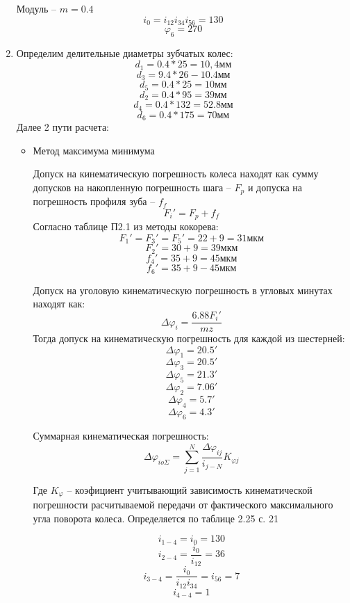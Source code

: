 \documentclass{article}
\begin{document}
\begin{enumerate}
	Модуль -- $m = 0.4$
	$$
	i_0 = i_{12} i_{34} i_{56} = 130
	$$
	$$
	\varphi_6 = 270
	$$
	\item Определим делительные диаметры зубчатых колес:
	$$
	d_1 = 0.4 *25 = 10,4 мм
	$$
	$$
	d_3 = 9.4 * 26 - 10.4 мм
	$$
	$$
	d_5 = 0.4 * 25 = 10 мм
	$$
	$$
	d_2 = 0.4 * 95 = 39 мм
	$$
	$$
	d_4 = 0.4 * 132 = 52.8 мм
	$$
	$$
	d_6 = 0.4 * 175 = 70 мм
	$$
	Далее 2 пути расчета:
	\begin{itemize}
		\item Метод максимума минимума

		Допуск на кинематическую погрешность колеса находят как сумму допусков на накопленную погрешность шага -- $F_p$ и допуска на погрешность профиля зуба -- $f_f$
		$$
		F_i' = F_p + f_f
		$$
		Согласно таблице П2.1 из методы кокорева:
		$$
		F_1' = F_3' = F_5' = 22 + 9 = 31 мкм
		$$
		$$
		F_2' = 30 + 9 = 39 мкм
		$$
		$$
		f_4' = 35 + 9 = 45 мкм
		$$
		$$
		f_6' = 35 + 9 - 45 мкм
		$$

		Допуск на уголовую кинематическую погрешность в угловых минутах находят как:
		$$
		\Delta \varphi_i = \frac{6.88 F_i'}{m z}
		$$
		Тогда допуск на кинематическую погрешность для каждой из шестерней:
		$$
		\Delta \varphi_1 = 20.5'
		$$
		$$
		\Delta \varphi_3 = 20.5'
		$$
		$$
		\Delta \varphi_5 = 21.3'
		$$
		$$
		\Delta \varphi_2 = 7.06'
		$$
		$$
		\Delta \varphi_4 = 5.7'
		$$
		$$
		\Delta \varphi_6 = 4.3'
		$$
		
		Суммарная кинематическая погрешность:
		$$
		\Delta \varphi_{io\Sigma} = \sum\limits_{j=1}^{N} \frac{ \Delta \varphi_{ij}}{i_{j-N}} K_{\varphi j}
		$$

		Где $K_{\varphi}$ -- коэфициент учитывающий зависимость кинематической погрешности расчитываемой передачи от фактического максимального угла поворота колеса. Определяется по таблице 2.25 с. 21

		$$
		i_{1-4} = i_0 = 130
		$$
		$$
		i_{2-4} = \frac{i_0}{i_{12}} = 36
		$$
		$$
		i_{3-4} = \frac{i_0}{i_{12} i_{34}} = i_{56} = 7
		$$
		$$
		i_{4-4} = 1
		$$


\end{itemize}
\end{enumerate}
\end{document}
